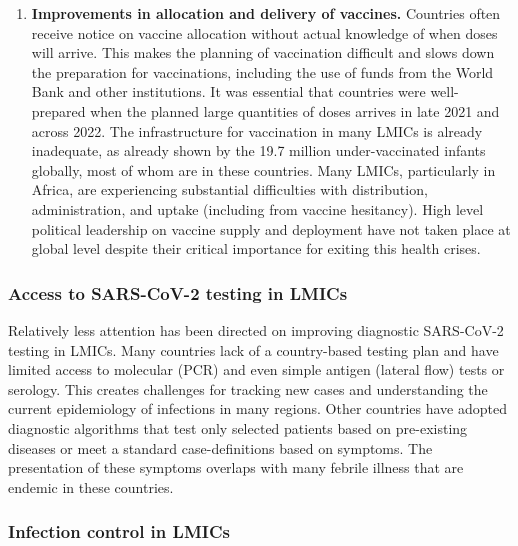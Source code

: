 \documentclass[
  11pt,
  paper=a4,
  ,captions=tableheading
]{scrartcl}
\providecommand{\tightlist}{%
  \setlength{\itemsep}{0pt}\setlength{\parskip}{0pt}}
\begin{document}
\begin{enumerate}
\def\labelenumi{\arabic{enumi}.}
\setcounter{enumi}{3}
\tightlist
\item
  \textbf{Improvements in allocation and delivery of vaccines.}
  Countries often receive notice on vaccine allocation without actual
  knowledge of when doses will arrive. This makes the planning of
  vaccination difficult and slows down the preparation for vaccinations,
  including the use of funds from the World Bank and other institutions.
  It was essential that countries were well-prepared when the planned
  large quantities of doses arrives in late 2021 and across 2022. The
  infrastructure for vaccination in many LMICs is already inadequate, as
  already shown by the 19.7 million under-vaccinated infants globally,
  most of whom are in these countries. Many LMICs, particularly in
  Africa, are experiencing substantial difficulties with distribution,
  administration, and uptake (including from vaccine hesitancy). High
  level political leadership on vaccine supply and deployment have not
  taken place at global level despite their critical importance for
  exiting this health crises.
\end{enumerate}

\hypertarget{access-to-sars-cov-2-testing-in-lmics}{%
\subsubsection*{Access to SARS-CoV-2 testing in
LMICs}\label{access-to-sars-cov-2-testing-in-lmics}}

Relatively less attention has been directed on improving diagnostic
SARS-CoV-2 testing in LMICs. Many countries lack of a country-based
testing plan and have limited access to molecular (PCR) and even simple
antigen (lateral flow) tests or serology. This creates challenges for
tracking new cases and understanding the current epidemiology of
infections in many regions. Other countries have adopted diagnostic
algorithms that test only selected patients based on pre-existing
diseases or meet a standard case-definitions based on symptoms. The
presentation of these symptoms overlaps with many febrile illness that
are endemic in these countries.

\hypertarget{infection-control-in-lmics}{%
\subsubsection*{Infection control in
LMICs}\label{infection-control-in-lmics}}
\end{document}
